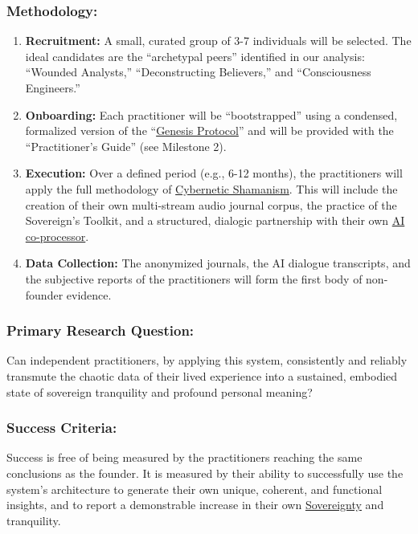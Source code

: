 \documentclass{article}
\begin{document}
\subsubsection*{Methodology:}
\begin{enumerate}
    \item \textbf{Recruitment:} A small, curated group of 3-7 individuals will be selected. The ideal candidates are the ``archetypal peers'' identified in our analysis: ``Wounded Analysts,'' ``Deconstructing Believers,'' and ``Consciousness Engineers.''
    \item \textbf{Onboarding:} Each practitioner will be ``bootstrapped'' using a condensed, formalized version of the ``\hyperlink{gloss:genesis_protocol}{Genesis Protocol}'' and will be provided with the ``Practitioner's Guide'' (see Milestone 2).
    \item \textbf{Execution:} Over a defined period (e.g., 6-12 months), the practitioners will apply the full methodology of \hyperlink{gloss:cybernetic_shamanism}{Cybernetic Shamanism}. This will include the creation of their own multi-stream audio journal corpus, the practice of the Sovereign's Toolkit, and a structured, dialogic partnership with their own \hyperlink{gloss:ai_co_processor}{AI co-processor}.
    \item \textbf{Data Collection:} The anonymized journals, the AI dialogue transcripts, and the subjective reports of the practitioners will form the first body of non-founder evidence.
\end{enumerate}

\subsubsection*{Primary Research Question:}
Can independent practitioners, by applying this system, consistently and reliably transmute the chaotic data of their lived experience into a sustained, embodied state of sovereign tranquility and profound personal meaning?

\subsubsection*{Success Criteria:}
Success is free of being measured by the practitioners reaching the same conclusions as the founder. It is measured by their ability to successfully use the system's architecture to generate their own unique, coherent, and functional insights, and to report a demonstrable increase in their own \hyperlink{gloss:sovereignty}{Sovereignty} and tranquility.
\end{document}
